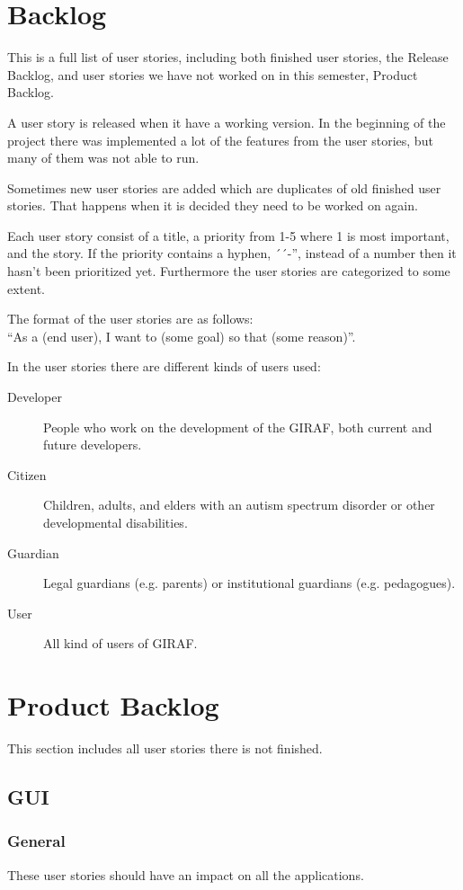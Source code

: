 \section{Backlog}\label{Appendix_secBacklog}
This is a full list of user stories, including both finished user stories, the Release Backlog, and user stories we have not worked on in this semester, Product Backlog.

A user story is released when it have a working version. In the beginning of the project there was implemented a lot of the features from the user stories, but many of them was not able to run.

Sometimes new user stories are added which are duplicates of old finished user stories. That happens when it is decided they need to be worked on again.

Each user story consist of a title, a priority from 1-5 where 1 is most important, and the story. If the priority contains a hyphen, ´´-'', instead of a number then it hasn't been prioritized yet.
Furthermore the user stories are categorized to some extent.

The format of the user stories are as follows: \\
``As a (end user), I want to (some goal) so that (some reason)''.

In the user stories there are different kinds of users used:
\begin{description}
	\item [Developer] People who work on the development of the GIRAF, both current and future developers.
	\item [Citizen] Children, adults, and elders with an autism spectrum disorder or other developmental disabilities.
	\item [Guardian] Legal guardians (e.g. parents) or institutional guardians (e.g. pedagogues).
	\item [User] All kind of users of GIRAF.
\end{description}

\section{Product Backlog}
This section includes all user stories there is not finished.

\subsection{GUI}

\subsubsection{General}
These user stories should have an impact on all the applications.

